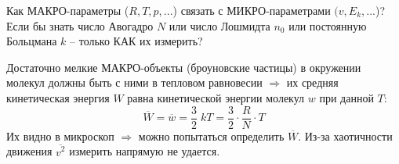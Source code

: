 \sf\Large

Как МАКРО-параметры ($R,T,p,...$) связать с МИКРО-параметрами $(v,E_k,...$)? Если бы знать число Авогадро $N$ или число Лошмидта $n_0$ или постоянную Больцмана $k$ -- только КАК их измерить?

Достаточно мелкие МАКРО-объекты (броуновские частицы) в окру\-же\-нии молекул должны быть с ними в тепловом равновесии $\Rightarrow$ их средняя кинетическая энергия $W$ равна кинетической энергии молекул $w$ при дан\-ной $T$:\vspace{-3mm}
\begin{displaymath}
\overline{W}=\overline{w}=\frac32\;kT = \frac32\cdot\frac RN\cdot T
\end{displaymath}
Их видно в микроскоп $\Rightarrow$ можно попытаться определить $\overline{W}$. Из-за хао\-тич\-но\-с\-ти движения $\overline{v^2}$ измерить напрямую не удается.\\
